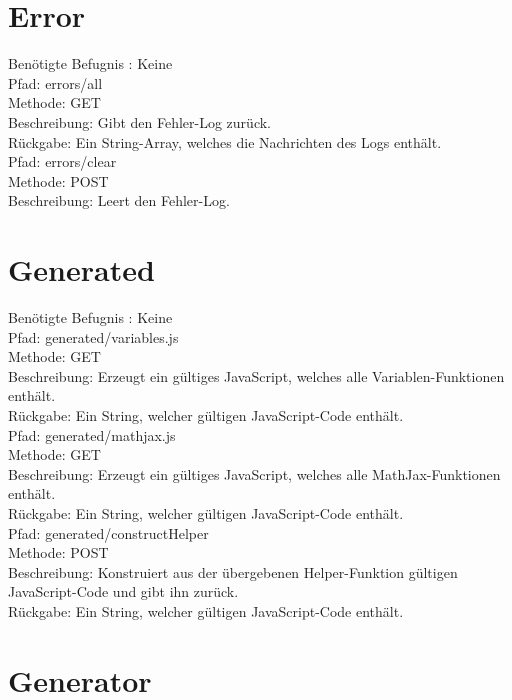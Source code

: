 \section{Error}

Benötigte Befugnis : Keine \\

\noindent Pfad: errors/all\\
Methode: GET \\
Beschreibung: Gibt den Fehler-Log zurück. \\
Rückgabe: Ein String-Array, welches die Nachrichten des Logs enthält. \\

\noindent Pfad: errors/clear\\
Methode: POST \\
Beschreibung: Leert den Fehler-Log. \\

\section{Generated}

Benötigte Befugnis : Keine \\

\noindent Pfad: generated/variables.js\\
Methode: GET \\
Beschreibung: Erzeugt ein gültiges JavaScript, welches alle Variablen-Funktionen enthält. \\
Rückgabe: Ein String, welcher gültigen JavaScript-Code enthält. \\

\noindent Pfad: generated/mathjax.js\\
Methode: GET \\
Beschreibung: Erzeugt ein gültiges JavaScript, welches alle MathJax-Funktionen enthält. \\
Rückgabe: Ein String, welcher gültigen JavaScript-Code enthält. \\

\noindent Pfad: generated/constructHelper\\
Methode: POST \\
Beschreibung: Konstruiert aus der übergebenen Helper-Funktion gültigen JavaScript-Code und gibt ihn zurück.  \\
Rückgabe: Ein String, welcher gültigen JavaScript-Code enthält. \\


\section{Generator}

